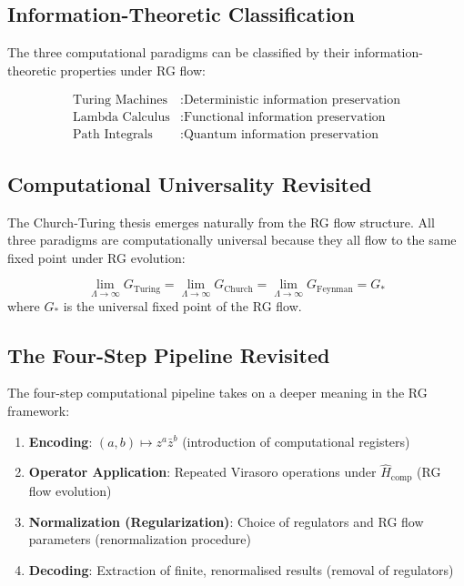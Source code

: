 \subsection{Information-Theoretic Classification}

\begin{theorem}
\label{thm:info-classification}
The three computational paradigms can be classified by their information-theoretic properties under RG flow:

\begin{align}
\text{Turing Machines} &: \text{Deterministic information preservation} \\
\text{Lambda Calculus} &: \text{Functional information preservation} \\
\text{Path Integrals} &: \text{Quantum information preservation}
\end{align}
\end{theorem}

\subsection{Computational Universality Revisited}

\begin{theorem}
\label{thm:universality-rg}
The Church-Turing thesis emerges naturally from the RG flow structure. All three paradigms are computationally universal because they all flow to the same fixed point under RG evolution:

\[
\lim_{\Lambda \to \infty} G_{\text{Turing}} = \lim_{\Lambda \to \infty} G_{\text{Church}} = \lim_{\Lambda \to \infty} G_{\text{Feynman}} = G_*
\]
where $G_*$ is the universal fixed point of the RG flow.
\end{theorem}

\subsection{The Four-Step Pipeline Revisited}

\begin{definition}
\label{def:rg-pipeline}
The four-step computational pipeline takes on a deeper meaning in the RG framework:

\begin{enumerate}
\item \textbf{Encoding}: $(a,b) \mapsto z^a \bar{z}^b$ (introduction of computational registers)
\item \textbf{Operator Application}: Repeated Virasoro operations under $\hat H_{\text{comp}}$ (RG flow evolution)
\item \textbf{Normalization (Regularization)}: Choice of regulators and RG flow parameters (renormalization procedure)
\item \textbf{Decoding}: Extraction of finite, renormalised results (removal of regulators)
\end{enumerate}
\end{definition}

